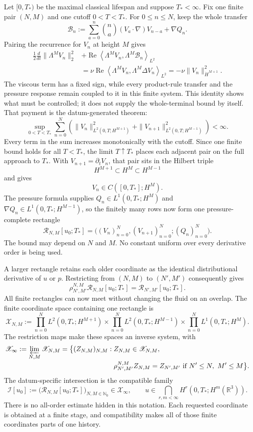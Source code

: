 Let \([0,T_*)\) be the maximal classical lifespan and suppose
\(T_*<\infty\).  Fix one finite pair \((N,M)\) and one cutoff
\(0<T<T_*\).  For \(0\le n\le N\), keep the whole transfer
\[
 \mathcal B_n
 :=\sum_{a=0}^{n}\binom na(V_a\!\cdot\nabla)V_{n-a}+\nabla Q_n.
\]
Pairing the recurrence for \(V_n\) at height \(M\) gives
\[
\begin{aligned}
 \frac12\frac{d}{dt}\|\Lambda^M V_n\|_2^2
 &+\operatorname{Re}\left\langle
   \Lambda^M V_n,\Lambda^M\mathcal B_n
  \right\rangle_{L^2}\\
 &=\nu\operatorname{Re}\left\langle
   \Lambda^M V_n,\Lambda^M\Delta V_n
  \right\rangle_{L^2}
 =-\nu\|V_n\|_{\dot H^{M+1}}^2.
\end{aligned}
\]
The viscous term has a fixed sign, while every product-rule transfer and the
pressure response remain coupled to it in this finite system.  This identity
shows what must be controlled; it does not supply the whole-terminal bound by
itself.  That payment is the datum-generated theorem:
\[
 \sup_{0<T<T_*}\sum_{n=0}^{N}\left(
  \|V_n\|_{L^2(0,T;H^{M+1})}^2
  +\|V_{n+1}\|_{L^2(0,T;H^{M-1})}^2
 \right)<\infty.
\]
Every term in the sum increases monotonically with the cutoff.  Since one
finite bound holds for all \(T<T_*\), the limit \(T\uparrow T_*\) places each
adjacent pair on the full approach to \(T_*\).  With
\(V_{n+1}=\partial_tV_n\), that pair sits in the Hilbert triple
\[
 H^{M+1}\subset H^M\subset H^{M-1}
\]
and gives
\[
 V_n\in C([0,T_*];H^M).
\]
The pressure formula supplies
\(Q_n\in L^1(0,T_*;H^M)\) and
\(\nabla Q_n\in L^1(0,T_*;H^{M-1})\), so the finitely many rows now form one
pressure-complete rectangle
\[
 \mathcal R_{N,M}[u_0;T_*]
 =\bigl((V_n)_{n=0}^{N},(V_{n+1})_{n=0}^{N};(Q_n)_{n=0}^{N}\bigr).
\]
The bound may depend on \(N\) and \(M\).  No constant uniform over every
derivative order is being used.

A larger rectangle retains each older coordinate as the identical
distributional derivative of \(u\) or \(p\).  Restricting from
\((N,M)\) to \((N',M')\) consequently gives
\[
 \rho_{N',M'}^{N,M}\mathcal R_{N,M}[u_0;T_*]
 =\mathcal R_{N',M'}[u_0;T_*].
\]
All finite rectangles can now meet without changing the fluid on an overlap.
The finite coordinate space containing one rectangle is
\[
 \mathscr X_{N,M}
 :=\prod_{n=0}^{N}L^2(0,T_*;H^{M+1})
 \times\prod_{n=0}^{N}L^2(0,T_*;H^{M-1})
 \times\prod_{n=0}^{N}L^1(0,T_*;H^M).
\]
The restriction maps make these spaces an inverse system, with
\[
\begin{aligned}
 \mathscr X_\infty
 :=\varprojlim_{N,M}\mathscr X_{N,M}
 =\bigl\{(Z_{N,M})_{N,M}:{}&
 Z_{N,M}\in\mathscr X_{N,M},\\[-2pt]
 &\rho_{N',M'}^{N,M}Z_{N,M}=Z_{N',M'}
 \ \text{if }N'\le N,\ M'\le M\bigr\}.
\end{aligned}
\]
The datum-specific intersection is the compatible family
\[
 \mathcal I[u_0]
 :=\bigl(\mathcal R_{N,M}[u_0;T_*]\bigr)_{N,M\in\mathbb N_0}
 \in\mathscr X_\infty,
 \qquad
 u\in\bigcap_{r,m<\infty}H^r(0,T_*;H^m(\mathbb R^3)).
\]
There is no all-order estimate hidden in this notation.  Each requested
coordinate is obtained at a finite stage, and compatibility makes all of
those finite coordinates parts of one history.

